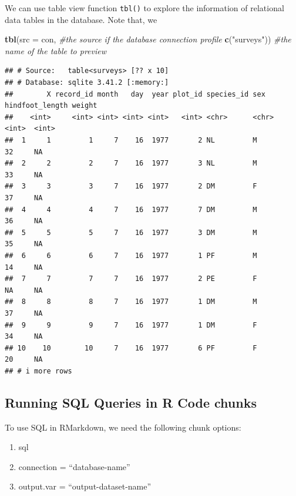\documentclass[
]{book}
\newenvironment{Shaded}{\begin{snugshade}}{\end{snugshade}}
\newcommand{\AttributeTok}[1]{\textcolor[rgb]{0.13,0.29,0.53}{#1}}
\newcommand{\CommentTok}[1]{\textcolor[rgb]{0.56,0.35,0.01}{\textit{#1}}}
\newcommand{\FunctionTok}[1]{\textcolor[rgb]{0.13,0.29,0.53}{\textbf{#1}}}
\newcommand{\NormalTok}[1]{#1}
\newcommand{\StringTok}[1]{\textcolor[rgb]{0.31,0.60,0.02}{#1}}
\providecommand{\tightlist}{%
  \setlength{\itemsep}{0pt}\setlength{\parskip}{0pt}}
\begin{document}
We can use table view function \texttt{tbl()} to explore the information of relational data tables in the database. Note that, we

\begin{Shaded}
\begin{Highlighting}[]
\FunctionTok{tbl}\NormalTok{(}\AttributeTok{src =}\NormalTok{ con, }\CommentTok{\#the source if the database connection profile}
    \FunctionTok{c}\NormalTok{(}\StringTok{"surveys"}\NormalTok{)) }\CommentTok{\#the name of the table to preview}
\end{Highlighting}
\end{Shaded}

\begin{verbatim}
## # Source:   table<surveys> [?? x 10]
## # Database: sqlite 3.41.2 [:memory:]
##        X record_id month   day  year plot_id species_id sex   hindfoot_length weight
##    <int>     <int> <int> <int> <int>   <int> <chr>      <chr>           <int>  <int>
##  1     1         1     7    16  1977       2 NL         M                  32     NA
##  2     2         2     7    16  1977       3 NL         M                  33     NA
##  3     3         3     7    16  1977       2 DM         F                  37     NA
##  4     4         4     7    16  1977       7 DM         M                  36     NA
##  5     5         5     7    16  1977       3 DM         M                  35     NA
##  6     6         6     7    16  1977       1 PF         M                  14     NA
##  7     7         7     7    16  1977       2 PE         F                  NA     NA
##  8     8         8     7    16  1977       1 DM         M                  37     NA
##  9     9         9     7    16  1977       1 DM         F                  34     NA
## 10    10        10     7    16  1977       6 PF         F                  20     NA
## # i more rows
\end{verbatim}

\hypertarget{running-sql-queries-in-r-code-chunks}{%
\subsection{Running SQL Queries in R Code chunks}\label{running-sql-queries-in-r-code-chunks}}

To use SQL in RMarkdown, we need the following chunk options:

\begin{enumerate}
\def\labelenumi{\arabic{enumi}.}
\tightlist
\item
  sql
\item
  connection = ``database-name''
\item
  output.var = ``output-dataset-name''
\end{enumerate}
\end{document}
